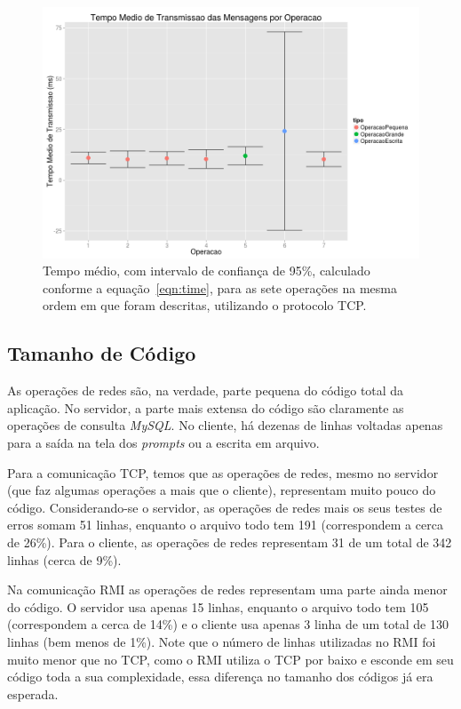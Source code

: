 \documentclass[12pt,a4paper]{article}
\begin{document}
\begin{figure}[h]
\centering
\includegraphics[width=\textwidth]{resultadosTempoTransmissaoTCP.png}
\caption{Tempo médio, com intervalo de confiança de 95\%, calculado conforme a equação~\ref{eqn:time}, para as sete operações na mesma ordem em que foram descritas, utilizando o protocolo TCP.}
\label{fig:transmissao}
\end{figure}

\subsection{Tamanho de Código}

As operações de redes são, na verdade, parte pequena do código total da aplicação. No servidor, a parte mais extensa do código são claramente as operações de consulta {\it MySQL}. No cliente, há dezenas de linhas voltadas apenas para a saída na tela dos {\it prompts} ou a escrita em arquivo.

Para a comunicação TCP, temos que as operações de redes, mesmo no servidor (que faz algumas operações a mais que o cliente), representam muito pouco do código. Considerando-se o servidor, as operações de redes mais os seus testes de erros somam 51 linhas, enquanto o arquivo todo tem 191 (correspondem a cerca de 26\%). Para o cliente, as operações de redes representam 31 de um total de 342 linhas (cerca de 9\%).

Na comunicação RMI as operações de redes representam uma parte ainda menor do código. O servidor usa apenas 15 linhas, enquanto o arquivo todo tem 105 (correspondem a cerca de 14\%) e o cliente usa apenas 3 linha de um total de 130 linhas (bem menos de 1\%). Note que o número de linhas utilizadas no RMI foi muito menor que no TCP, como o RMI utiliza o TCP por baixo e esconde em seu código toda a sua complexidade, essa diferença no tamanho dos códigos já era esperada.
\end{document}
